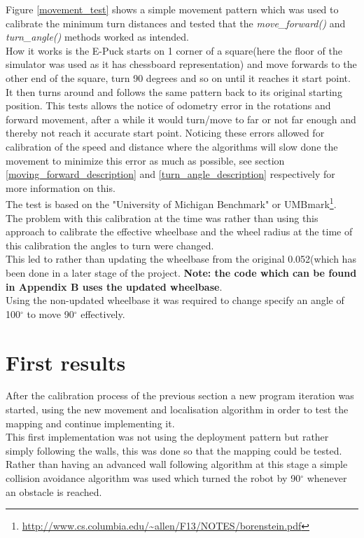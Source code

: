 Figure \ref{movement_test} shows a simple movement pattern which was used to calibrate the minimum turn distances and tested that the \textit{move\_forward()} and \textit{turn\_angle()} methods worked as intended. \\
How it works is the E-Puck starts on 1 corner of a square(here the floor of the simulator was used as it has chessboard representation) and move forwards to the other end of the square, turn 90 degrees and so on until it reaches it start point. It then turns around and follows the same pattern back to its original starting position. This tests allows the notice of odometry error in the rotations and forward movement, after a while it would turn/move to far or not far enough and thereby not reach it accurate start point. Noticing these errors allowed for calibration of the speed and distance where the algorithms will slow done the movement to minimize this error as much as possible, see section \ref{moving_forward_description} and \ref{turn_angle_description} respectively for more information on this.\\[3ex]
The test is based on the "University of Michigan Benchmark" or UMBmark\footnote{\url{http://www.cs.columbia.edu/~allen/F13/NOTES/borenstein.pdf}}.\\[3ex]

The problem with this calibration at the time was rather than using this approach to calibrate the effective wheelbase and the wheel radius at the time of this calibration the angles to turn were changed.\\
This led to rather than updating the wheelbase from  the original 0.052(which has been done in a later stage of the project. \textbf{Note: the code which can be found in Appendix B uses the updated wheelbase}.\\
Using the non-updated wheelbase it was required to change specify an angle of 100$^{\circ}$ to move 90$^{\circ}$ effectively.

\section{First results}
After the calibration process of the previous section a new program iteration was started, using the new movement and localisation algorithm in order to test the mapping and continue implementing it. \\[3ex]

This first implementation was not using the deployment pattern but rather simply following the walls, this was done so that the mapping could be tested. Rather than having an advanced wall following algorithm at this stage a simple collision avoidance algorithm was used which turned the robot by 90$^\circ$ whenever an obstacle is reached.

